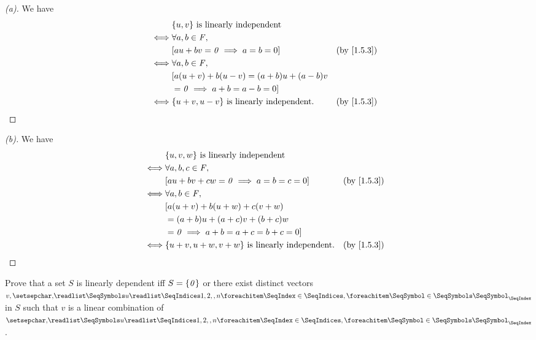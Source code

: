 \begin{proof}[(a)]
  We have
  \begin{align*}
         & \set{u, v} \text{ is linearly independent}                                        \\
    \iff & \forall a, b \in \F,                                                              \\
         & [au + bv = \zv \implies a = b = 0]                  &  & \text{(by \cref{1.5.3})} \\
    \iff & \forall a, b \in \F,                                                              \\
         & [a(u + v) + b(u - v) = (a + b) u + (a - b) v                                      \\
         & = \zv \implies a + b = a - b = 0]                                                 \\
    \iff & \set{u + v, u - v} \text{ is linearly independent}. &  & \text{(by \cref{1.5.3})}
  \end{align*}
\end{proof}

\begin{proof}[(b)]
  We have
  \begin{align*}
         & \set{u, v, w} \text{ is linearly independent}                                            \\
    \iff & \forall a, b, c \in \F,                                                                  \\
         & [au + bv + cw = \zv \implies a = b = c = 0]                &  & \text{(by \cref{1.5.3})} \\
    \iff & \forall a, b \in \F,                                                                     \\
         & [a(u + v) + b(u + w) + c(v + w)                                                          \\
         & = (a + b) u + (a + c) v + (b + c) w                                                      \\
         & = \zv \implies a + b = a + c = b + c = 0]                                                \\
    \iff & \set{u + v, u + w, v + w} \text{ is linearly independent}. &  & \text{(by \cref{1.5.3})}
  \end{align*}
\end{proof}

\begin{ex}\label{ex:1.5.14}
  Prove that a set \(S\) is linearly dependent iff \(S = \left\lbrace\mathit{0}\right\rbrace\) or there exist distinct vectors \(v, \seq{u}{1,2,,n}\) in \(S\) such that \(v\) is a linear combination of \(\seq{u}{1,2,,n}\).
\end{ex}

